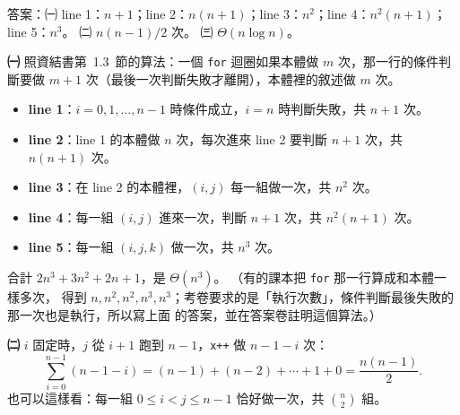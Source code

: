 \begin{pastsoln}
答案：㈠ line 1：$n + 1$；line 2：$n(n + 1)$；line 3：$n^2$；line 4：$n^2(n + 1)$；line 5：$n^3$。
㈡ $n(n-1)/2$ 次。 ㈢ $\Theta(n \log n)$。

\textbf{㈠} 照資結書第~1.3~節的算法：一個 \texttt{for} 迴圈如果本體做 $m$ 次，那一行的條件判斷要做
$m + 1$ 次（最後一次判斷失敗才離開），本體裡的敘述做 $m$ 次。
\begin{itemize}
\item \textbf{line 1}：$i = 0, 1, \ldots, n - 1$ 時條件成立，$i = n$ 時判斷失敗，共 $n + 1$ 次。
\item \textbf{line 2}：line 1 的本體做 $n$ 次，每次進來 line 2 要判斷 $n + 1$ 次，共 $n(n + 1)$ 次。
\item \textbf{line 3}：在 line 2 的本體裡，$(i, j)$ 每一組做一次，共 $n^2$ 次。
\item \textbf{line 4}：每一組 $(i, j)$ 進來一次，判斷 $n + 1$ 次，共 $n^2(n + 1)$ 次。
\item \textbf{line 5}：每一組 $(i, j, k)$ 做一次，共 $n^3$ 次。
\end{itemize}
合計 $2n^3 + 3n^2 + 2n + 1$，是 $\Theta(n^3)$。 （有的課本把 \texttt{for} 那一行算成和本體一樣多次，
得到 $n, n^2, n^2, n^3, n^3$；考卷要求的是「執行次數」，條件判斷最後失敗的那一次也是執行，所以寫上面
的答案，並在答案卷註明這個算法。）

\textbf{㈡} $i$ 固定時，$j$ 從 $i + 1$ 跑到 $n - 1$，\texttt{x++} 做 $n - 1 - i$ 次：
\[
\sum_{i=0}^{n-1} (n - 1 - i) = (n-1) + (n-2) + \cdots + 1 + 0 = \frac{n(n-1)}{2}.
\]
也可以這樣看：每一組 $0 \le i < j \le n - 1$ 恰好做一次，共 $\binom{n}{2}$ 組。


\end{pastsoln}
